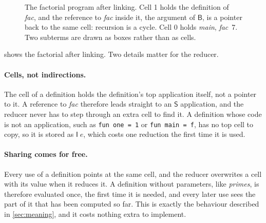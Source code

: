 \documentclass[11pt,a4paper]{article}
\newcommand{\cmb}[1]{\textsf{#1}}
\newcommand{\I}{\cmb{I}}
\newcommand{\Sc}{\cmb{S}}
\newcommand{\B}{\cmb{B}}
\newcommand{\C}{\cmb{C}}
\newcommand{\Cp}{\cmb{C}'}
\newcommand{\IF}{\cmb{IF}}
\newcommand{\gcell}[5][half]{%
  \node[#1, anchor=east] (#2-f) at (#3) {#4};
  \node[#1, anchor=west] (#2-a) at (#3) {#5};}
\theoremstyle{definition}
\theoremstyle{plain}
\begin{document}
\begin{figure}[t]
\centering
{}
\caption{The factorial program after linking. Cell 1 holds the definition of
\textit{fac}, and the reference to \textit{fac} inside it, the argument of
$\B$, is a pointer back to the same cell: recursion is a cycle. Cell 0 holds
\textit{main}, \textit{fac}~7. Two subterms are drawn as boxes rather than as
cells.}
\label{fig:linked}
\end{figure}

 shows the factorial after linking. Two details matter for
the reducer.

\paragraph{Cells, not indirections.} The cell of a definition holds the
definition's top application itself, not a pointer to it. A reference to
\textit{fac} therefore leads straight to an $\Sc$ application, and the
reducer never has to step through an extra cell to find it. A definition
whose code is not an application, such as \verb|fun one = 1| or
\verb|fun main = f|, has no top cell to copy, so it is stored as $\I\;e$, which
costs one reduction the first time it is used.

\paragraph{Sharing comes for free.} Every use of a definition points at the
same cell, and the reducer overwrites a cell with its value when it reduces
it. A definition without parameters, like \textit{primes}, is therefore
evaluated once, the first time it is needed, and every later use sees the
part of it that has been computed so far. This is exactly the behaviour
described in \cref{sec:meaning}, and it costs nothing extra to implement.
\end{document}
